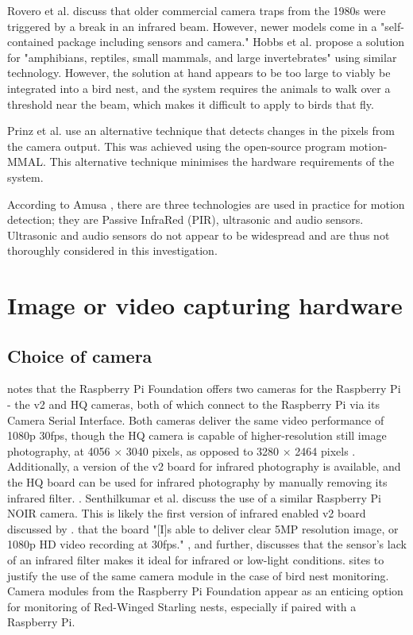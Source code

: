 \documentclass[class=report,11pt,crop=false]{standalone}
\begin{document}
Rovero et al. \cite{rovero2013which} discuss that older commercial camera traps from the 1980s were triggered by a break in an infrared beam. However, newer models come in a "self-contained package including sensors and camera." Hobbs et al. propose a solution for "amphibians, reptiles, small mammals, and large invertebrates" \cite{hobbs2017an} using similar technology. However, the solution at hand appears to be too large to viably be integrated into a bird nest, and the system requires the animals to walk over a threshold near the beam, which makes it difficult to apply to birds that fly.

Prinz et al. \cite{prinz2016a} use an alternative technique that detects changes in the pixels from the camera output. This was achieved using the open-source program motion-MMAL. This alternative technique minimises the hardware requirements of the system.

According to Amusa \cite{amusa2015pyro}, there are three technologies are used in practice for motion detection; they are Passive InfraRed (PIR), ultrasonic and audio sensors. Ultrasonic and audio sensors do not appear to be widespread and are thus not thoroughly considered in this investigation.


\section{Image or video capturing hardware}

\subsection{Choice of camera}

\cite{jolles2021broad-scale} notes that the Raspberry Pi Foundation offers two cameras for the Raspberry Pi - the v2 and HQ cameras, both of which connect to the Raspberry Pi via its Camera Serial Interface. Both cameras deliver the same video performance of 1080p 30fps, though the HQ camera is capable of higher-resolution still image photography, at 4056 × 3040 pixels, as opposed to 3280 × 2464 pixels \cite{jolles2021broad-scale}. Additionally, a version of the v2 board for infrared photography is available, and the HQ board can be used for infrared photography by manually removing its infrared filter. \cite{jolles2021broad-scale}. Senthilkumar et al. \cite{senthilkumar2014embedded} discuss the use of a similar Raspberry Pi NOIR camera. This is likely the first version of infrared enabled v2 board discussed by \cite{jolles2021broad-scale}. \cite{senthilkumar2014embedded} that the board "[I]s able to deliver clear 5MP resolution image, or 1080p HD video recording at 30fps." \cite{senthilkumar2014embedded}, and further, discusses that the sensor's lack of an infrared filter makes it ideal for infrared or low-light conditions. \cite{prinz2016a} sites \cite{senthilkumar2014embedded} to justify the use of the same camera module in the case of bird nest monitoring. Camera modules from the Raspberry Pi Foundation appear as an enticing option for monitoring of Red-Winged Starling nests, especially if paired with a Raspberry Pi.
\end{document}
